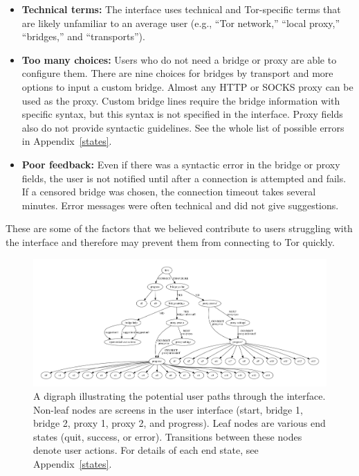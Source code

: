 \documentclass[USenglish,oneside,twocolumn]{article}
\begin{document}
\begin{itemize}
\item {\bfseries Technical terms:} The interface uses technical and Tor-specific terms that are likely unfamiliar to an average user (e.g., ``Tor network,'' ``local proxy,'' ``bridges,'' and ``transports''). 
\item {\bfseries Too many choices:}  Users who do not need a bridge or proxy are able to configure them. There are nine choices for bridges by transport and more options to input a custom bridge. Almost any HTTP or SOCKS proxy can be used as the proxy. Custom bridge lines require the bridge information with specific syntax, but this syntax is not specified in the interface. Proxy fields also do not provide syntactic guidelines. See the whole list of possible errors in Appendix~\ref{states}. 
\item {\bfseries Poor feedback:} Even if there was a syntactic error in the bridge or proxy fields, the user is not notified until after a connection is attempted and fails. If a censored bridge was chosen, the connection timeout takes several minutes. Error messages were often technical and did not give suggestions.
\end{itemize}

These are some of the factors that we believed contribute to users struggling with the interface and therefore may prevent them from connecting to Tor quickly.


\begin{figure}
\centering
\includegraphics[width=\textwidth]{torconfig.pdf}
\caption{
A digraph illustrating the potential user paths through the interface. Non-leaf nodes are screens in the user interface (start, bridge 1, bridge 2, proxy 1, proxy 2, and progress). Leaf nodes are various end states (quit, success, or error). Transitions between these nodes denote user actions. For details of each end state, see Appendix~\ref{states}. 
}
\label{fig:digraph}
\end{figure} 
\end{document}
